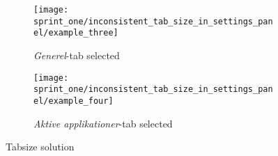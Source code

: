 \begin{figure}[!htbp]
    \centering

    \begin{subfigure}[t]{0.3\textwidth}
        \texttt{[image: sprint\_one/inconsistent\_tab\_size\_in\_settings\_panel/example\_three]}
        \caption{\emph{Generel}-tab selected}
        \label{fig:inconsistent_tab_size_in_settings_panel_example_one_solution}
    \end{subfigure}
    \hspace{5em} 
    \begin{subfigure}[t]{0.3\textwidth}
        \texttt{[image: sprint\_one/inconsistent\_tab\_size\_in\_settings\_panel/example\_four]}
        \caption{\emph{Aktive applikationer}-tab selected}
        \label{fig:inconsistent_tab_size_in_settings_panel_example_two_solution}
    \end{subfigure}
    
    \caption{Tabsize solution}
    \label{fig:inconsistent_tab_size_in_settings_panel_example_solution}
\end{figure}

\FloatBarrier